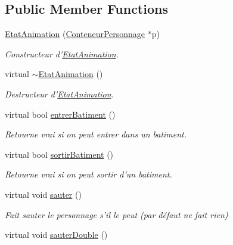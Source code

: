\subsection*{Public Member Functions}
\begin{DoxyCompactItemize}
\item 
\hyperlink{classEtatAnimation_a735417194759266d1749d5706011476e}{Etat\-Animation} (\hyperlink{classConteneurPersonnage}{Conteneur\-Personnage} $\ast$p)
\begin{DoxyCompactList}\small\item\em Constructeur d'\hyperlink{classEtatAnimation}{Etat\-Animation}. \end{DoxyCompactList}\item 
\hypertarget{classEtatAnimation_abee5bf6a63cc7d0c27e76eb1cca4a1aa}{virtual \hyperlink{classEtatAnimation_abee5bf6a63cc7d0c27e76eb1cca4a1aa}{$\sim$\-Etat\-Animation} ()}\label{classEtatAnimation_abee5bf6a63cc7d0c27e76eb1cca4a1aa}

\begin{DoxyCompactList}\small\item\em Destructeur d'\hyperlink{classEtatAnimation}{Etat\-Animation}. \end{DoxyCompactList}\item 
virtual bool \hyperlink{classEtatAnimation_a6883c9a9fa7863edbbe710f2a66760de}{entrer\-Batiment} ()
\begin{DoxyCompactList}\small\item\em Retourne vrai si on peut entrer dans un batiment. \end{DoxyCompactList}\item 
virtual bool \hyperlink{classEtatAnimation_ae5180ae244da1fce6c6190ccc669cb85}{sortir\-Batiment} ()
\begin{DoxyCompactList}\small\item\em Retourne vrai si on peut sortir d'un batiment. \end{DoxyCompactList}\item 
\hypertarget{classEtatAnimation_a39efb1d546be263bad1b9754085054f6}{virtual void \hyperlink{classEtatAnimation_a39efb1d546be263bad1b9754085054f6}{sauter} ()}\label{classEtatAnimation_a39efb1d546be263bad1b9754085054f6}

\begin{DoxyCompactList}\small\item\em Fait sauter le personnage s'il le peut (par défaut ne fait rien) \end{DoxyCompactList}\item 
\hypertarget{classEtatAnimation_aa6d6529e072279899c9f7f54929dffc9}{virtual void \hyperlink{classEtatAnimation_aa6d6529e072279899c9f7f54929dffc9}{sauter\-Double} ()}\label{classEtatAnimation_aa6d6529e072279899c9f7f54929dffc9}


\end{DoxyCompactItemize}
